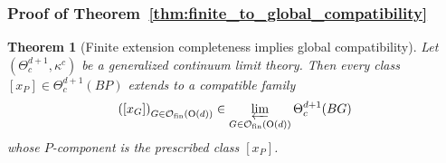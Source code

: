 \documentclass[aps,prx,reprint,superscriptaddress,twocolumn,amsmath,amssymb,amsfonts, nofootinbib]{revtex4-2}
\newcommand{\ofin}{\mathcal{O}_{\text{fin}}}
\theoremstyle{apsstyle}
\newtheorem{theorem}{Theorem}[section]
\begin{document}
\subsubsection{Proof of Theorem~\ref{thm:finite_to_global_compatibility}}

\begin{theorem}[Finite extension completeness implies global compatibility]
\label{thm:finite_to_global_compatibility_app} 
Let $(\Theta^{d+1}_{c},\kappa^{c})$ be a generalized continuum limit theory. Then every class $[x_P]\in\Theta^{d+1}_{c}(BP)$ extends to a compatible family
\begin{equation*}
\left([x_G]\right)_{G\in\ofin(\mathrm{O}(d))} \in \varprojlim_{G\in\ofin(\mathrm{O}(d))} \Theta^{d+1}_{c}(BG)
\end{equation*}
whose $P$-component is the prescribed class $[x_P]$.
\end{theorem}
\end{document}

